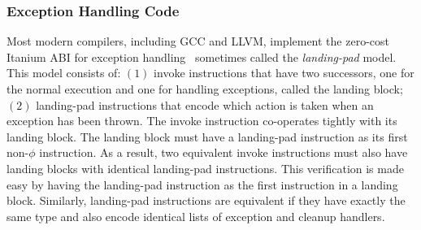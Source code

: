 \subsubsection*{Exception Handling Code}


Most modern compilers, including GCC and LLVM, implement the zero-cost Itanium ABI for exception handling~\cite{dinechin00} sometimes called the \textit{landing-pad} model.
This model consists of:
$(1)$ invoke instructions that have two successors, one for the normal execution and
one for handling exceptions, called the landing block;
$(2)$ landing-pad instructions that encode which action is taken when an exception has
been thrown.
The invoke instruction co-operates tightly with its landing block.
The landing block must have a landing-pad instruction as its first non-$\phi$
instruction.
As a result, two equivalent invoke instructions must also have landing blocks
with identical landing-pad instructions.
This verification is made easy by having the landing-pad instruction as the first
instruction in a landing block.
Similarly, landing-pad instructions are equivalent if they have exactly the same
type and also encode identical lists of exception and cleanup handlers.



